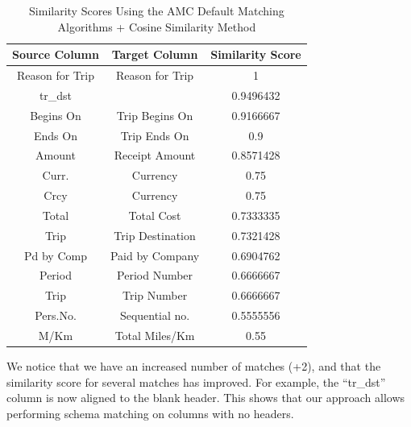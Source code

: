 \documentclass{../../Util/LaTEX/sig-alternate}
\begin{document}
\begin{table}[ht]
\centering
\begin{tabular}{|c|c|c|} \hline
\textbf{Source Column} & \textbf{Target Column} & \textbf{Similarity Score} \\ \hline
Reason for Trip & Reason for Trip & 1 \\ \hline
tr\_dst &  & 0.9496432 \\ \hline
Begins On & Trip Begins On & 0.9166667 \\ \hline
Ends On & Trip Ends On & 0.9 \\ \hline
Amount & Receipt Amount & 0.8571428 \\ \hline
Curr. & Currency & 0.75 \\ \hline
Crcy & Currency & 0.75 \\ \hline
Total & Total Cost & 0.7333335 \\ \hline
Trip & Trip Destination & 0.7321428 \\ \hline
Pd by Comp & Paid by Company & 0.6904762 \\ \hline
Period & Period Number & 0.6666667 \\ \hline
Trip & Trip Number & 0.6666667 \\ \hline
Pers.No. & Sequential no. & 0.5555556 \\ \hline
M/Km & Total Miles/Km & 0.55 \\ \hline
\end{tabular}
\caption{Similarity Scores Using the AMC Default Matching Algorithms + Cosine Similarity Method}
\label{tab:Similarity_Scores_Using_the_AMC_Default_Matching_Algorithms_+_Cosine_Similarity_Method}
\end{table}


We notice that we have an increased number of matches (+2), and that the similarity score for several matches has improved. For example, the ``tr\_dst'' column is now aligned to the blank header. This shows that our approach allows performing schema matching on columns with no headers.
\end{document}
